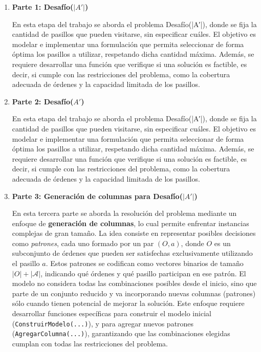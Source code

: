 \documentclass[a4paper,12pt]{article}
\begin{document}
\begin{enumerate}
    \item \textbf{Parte 1: Desafío(\(|A'|\))}
    
    En esta etapa del trabajo se aborda el problema Desafío(|A′|), donde se fija la cantidad de pasillos que pueden visitarse, sin especificar cuáles. El objetivo es modelar e implementar una formulación que permita seleccionar de forma óptima los pasillos a utilizar, respetando dicha cantidad máxima. Además, se requiere desarrollar una función que verifique si una solución es factible, es decir, si cumple con las restricciones del problema, como la cobertura adecuada de órdenes y la capacidad limitada de los pasillos.
    
    
    \item \textbf{Parte 2: Desafío(\(A'\))}
    
    En esta etapa del trabajo se aborda el problema Desafío(|A′|), donde se fija la cantidad de pasillos que pueden visitarse, sin especificar cuáles. El objetivo es modelar e implementar una formulación que permita seleccionar de forma óptima los pasillos a utilizar, respetando dicha cantidad máxima. Además, se requiere desarrollar una función que verifique si una solución es factible, es decir, si cumple con las restricciones del problema, como la cobertura adecuada de órdenes y la capacidad limitada de los pasillos.

    
    \item \textbf{Parte 3: Generación de columnas para Desafío(\(|A'|\)) }
    
    En esta tercera parte se aborda la resolución del problema mediante un enfoque de \textbf{generación de columnas}, lo cual permite enfrentar instancias complejas de gran tamaño. La idea consiste en representar posibles decisiones como \textit{patrones}, cada uno formado por un par $(O, a)$, donde $O$ es un subconjunto de órdenes que pueden ser satisfechas exclusivamente utilizando el pasillo $a$. Estos patrones se codifican como vectores binarios de tamaño $|O| + |\mathcal{A}|$, indicando qué órdenes y qué pasillo participan en ese patrón. El modelo no considera todas las combinaciones posibles desde el inicio, sino que parte de un conjunto reducido y va incorporando nuevas columnas (patrones) sólo cuando tienen potencial de mejorar la solución. Este enfoque requiere desarrollar funciones específicas para construir el modelo inicial (\texttt{ConstruirModelo(...)}), y para agregar nuevos patrones (\texttt{AgregarColumna(...)}), garantizando que las combinaciones elegidas cumplan con todas las restricciones del problema.



\end{enumerate}
\end{document}
